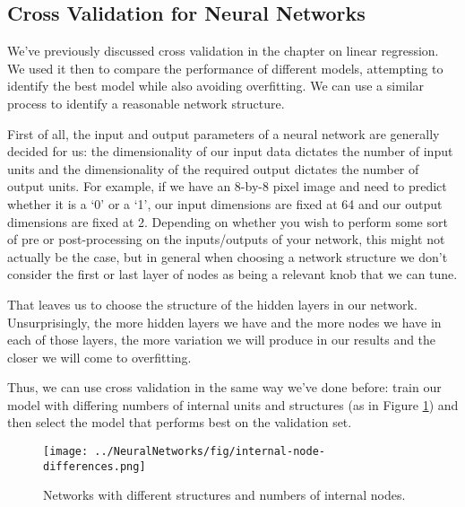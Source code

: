 \subsection{Cross Validation for Neural Networks}
We've previously discussed cross validation in the chapter on linear regression. We used it then to compare the performance of different models, attempting to identify the best model while also avoiding overfitting. We can use a similar process to identify a reasonable network structure.

First of all, the input and output parameters of a neural network are generally decided for us: the dimensionality of our input data dictates the number of input units and the dimensionality of the required output dictates the number of output units. For example, if we have an 8-by-8 pixel image and need to predict whether it is a `0' or a `1', our input dimensions are fixed at 64 and our output dimensions are fixed at 2. Depending on whether you wish to perform some sort of pre or post-processing on the inputs/outputs of your network, this might not actually be the case, but in general when choosing a network structure we don't consider the first or last layer of nodes as being a relevant knob that we can tune.

That leaves us to choose the structure of the hidden layers in our network. Unsurprisingly, the more hidden layers we have and the more nodes we have in each of those layers, the more variation we will produce in our results and the closer we will come to overfitting.

Thus, we can use cross validation in the same way we've done before: train our model with differing numbers of internal units and structures (as in Figure \ref{fig:internal-node-differences}) and then select the model that performs best on the validation set.

\begin{figure}
    \centering
    \texttt{[image: ../NeuralNetworks/fig/internal-node-differences.png]}
    \caption{Networks with different structures and numbers of internal nodes.}
    \label{fig:internal-node-differences}
\end{figure}


